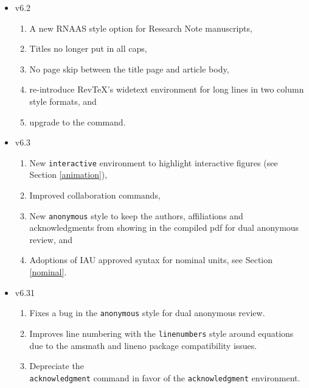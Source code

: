 \documentclass[linenumbers]{aastex631}
\begin{document}
\begin{itemize}
  \item{v6.2}
    \begin{enumerate}
      \item A new RNAAS style option for Research Note manuscripts,
      \item Titles no longer put in all caps,
      \item No page skip between the title page and article body,
      \item re-introduce RevTeX's widetext environment for long lines in two column style formats, and
      \item upgrade to the {\tt\string\doi} command.
    \end{enumerate}
  \item{v6.3}
    \begin{enumerate}
      \item New {\tt\string interactive} environment to highlight interactive figures (see Section \ref{animation}),
      \item Improved collaboration commands, 
      \item New {\tt\string anonymous} style to keep the authors, affiliations and acknowledgments from showing in the compiled pdf for dual anonymous review, and
      \item Adoptions of IAU approved syntax for nominal units, see Section \ref{nominal}.
    \end{enumerate}
  \item{v6.31}
    \begin{enumerate}
      \item Fixes a bug in the {\tt\string anonymous} style for dual anonymous review.
      \item Improves line numbering with the {\tt\string linenumbers} style around equations due to the amsmath and lineno package compatibility issues.
      \item Depreciate the {\tt\string \\acknowledgment} command in favor of the {\tt\string acknowledgment} environment.
    \end{enumerate}
\end{itemize}
\end{document}
